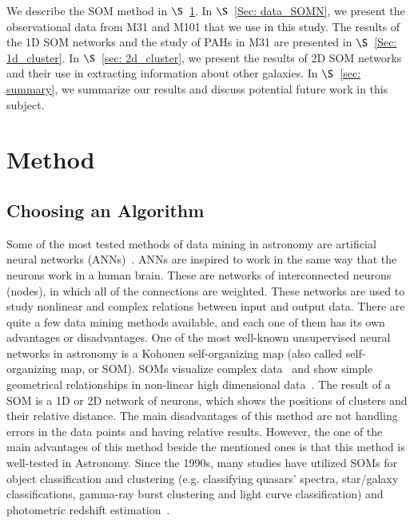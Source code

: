We describe the SOM method in $\S$~\ref{sec: method_SOMN}. 
In $\S$~\ref{Sec: data_SOMN}, we present the observational data from M31 and M101 that we use in this study.
The results of the 1D SOM networks and the study of PAHs in M31 are presented in $\S$~\ref{Sec: 1d_cluster}.
In $\S$~\ref{sec: 2d_cluster}, we present the results of 2D SOM networks and their use in extracting information about other galaxies.
In $\S$~\ref{sec: summary}, we summarize our results and discuss potential future work in this subject.
\section{Method}
\label{sec: method_SOMN}
\subsection{Choosing an Algorithm}

Some of the most tested methods of data mining in astronomy are artificial neural networks (ANNs)~\citep[e.g.][and references therein]{Hossein14,Hossein16}.
ANNs are inspired to work in the same way that the neurons work in a human brain.
These are networks of interconnected neurons (nodes), in which all of the connections are weighted.
These networks are used to study nonlinear and complex relations between input and output data.
There are quite a few data mining methods available, and each one of them has its own advantages or disadvantages. 
One of the most well-known unsupervised neural networks in astronomy is a Kohonen self-organizing map (also called self-organizing map, or SOM).
SOMs visualize complex data~\citep{Kohonen82} and show simple geometrical relationships in non-linear high dimensional data~\citep{Kohonen98}.
The result of a SOM is a 1D or 2D network of neurons, which shows the positions of clusters and their relative distance.
The main disadvantages of this method are not handling errors in the data points and having relative results.
However, the one of the main advantages of this method beside the mentioned ones is that this method is well-tested in Astronomy. 
Since the 1990s, many studies have utilized SOMs for object classification and clustering (e.g. classifying quasars' spectra, star/galaxy classifications, gamma-ray burst clustering and light curve classification) and photometric redshift estimation~\citep[e.g.][]{Odewahn92, Hernandez94, Murtagh95, Maehoenen95,Scaringi09,Geach12,Fustes13,Meusinger16}.

